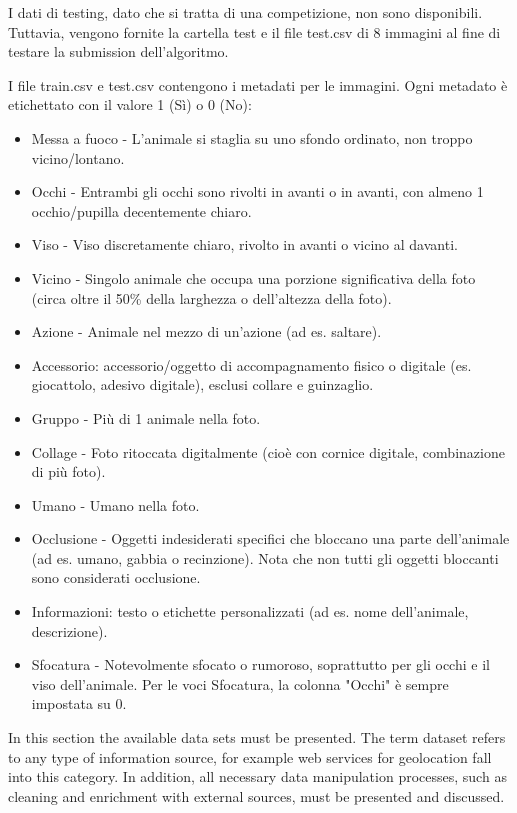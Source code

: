     I dati di testing, dato che si tratta di una competizione, non sono disponibili. Tuttavia, vengono fornite la cartella test e il file test.csv di 8 immagini al fine di testare la submission dell'algoritmo.

    I file train.csv e test.csv contengono i metadati per le immagini. Ogni metadato è etichettato con il valore 1 (Sì) o 0 (No):
        
    \begin{itemize}
        \item Messa a fuoco - L'animale si staglia su uno sfondo ordinato, non troppo vicino/lontano.
        \item Occhi - Entrambi gli occhi sono rivolti in avanti o in avanti, con almeno 1 occhio/pupilla decentemente chiaro.
        \item Viso - Viso discretamente chiaro, rivolto in avanti o vicino al davanti.
        \item Vicino - Singolo animale che occupa una porzione significativa della foto (circa oltre il 50\% della larghezza o dell'altezza della foto).
        \item Azione - Animale nel mezzo di un'azione (ad es. saltare).
        \item Accessorio: accessorio/oggetto di accompagnamento fisico o digitale (es. giocattolo, adesivo digitale), esclusi collare e guinzaglio.
        \item Gruppo - Più di 1 animale nella foto.
        \item Collage - Foto ritoccata digitalmente (cioè con cornice digitale, combinazione di più foto).
        \item Umano - Umano nella foto.
        \item Occlusione - Oggetti indesiderati specifici che bloccano una parte dell'animale (ad es. umano, gabbia o recinzione). Nota che non tutti gli oggetti bloccanti sono considerati occlusione.
        \item Informazioni: testo o etichette personalizzati (ad es. nome dell'animale, descrizione).
        \item Sfocatura - Notevolmente sfocato o rumoroso, soprattutto per gli occhi e il viso dell'animale. Per le voci Sfocatura, la colonna "Occhi" è sempre impostata su 0.
    \end{itemize}



In this section the available data sets must be presented. The term dataset refers to any type of information source, for example web services for geolocation fall into this category. 
In addition, all necessary data manipulation processes, such as cleaning and enrichment with external sources, must be presented and discussed.

